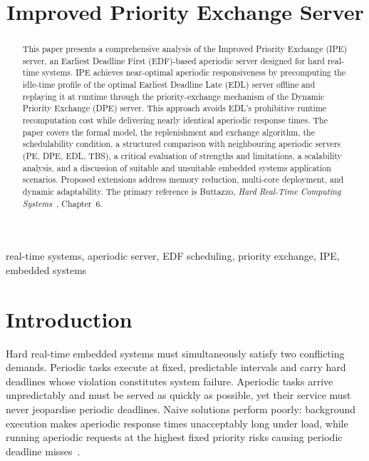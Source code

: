 \documentclass[conference]{IEEEtran}
\title{Improved Priority Exchange Server}
\author{%
  \IEEEauthorblockN{Sumon Boiddo}
  \IEEEauthorblockA{%
    BEng Electronic Engineering, Group~B, Team~6\\
    Hochschule Hamm-Lippstadt (HSHL), Lippstadt, Germany\\
    Matriculation Number:~2220054\\
    sumon.boiddo@stud.hshl.de}
}
\begin{document}
\maketitle

\begin{abstract}
This paper presents a comprehensive analysis of the Improved
Priority Exchange (IPE) server, an Earliest Deadline First
(EDF)-based aperiodic server designed for hard real-time systems.
IPE achieves near-optimal aperiodic responsiveness by
precomputing the idle-time profile of the optimal Earliest
Deadline Late (EDL) server offline and replaying it at runtime
through the priority-exchange mechanism of the Dynamic Priority
Exchange (DPE) server. This approach avoids EDL's prohibitive
runtime recomputation cost while delivering nearly identical
aperiodic response times. The paper covers the formal model,
the replenishment and exchange algorithm, the schedulability
condition, a structured comparison with neighbouring aperiodic
servers (PE, DPE, EDL, TBS), a critical evaluation of
strengths and limitations, a scalability analysis, and a
discussion of suitable and unsuitable embedded systems
application scenarios. Proposed extensions address memory
reduction, multi-core deployment, and dynamic adaptability.
The primary reference is Buttazzo, \emph{Hard Real-Time
Computing Systems}~\cite{buttazzo2011}, Chapter~6.
\end{abstract}

\begin{IEEEkeywords}
real-time systems, aperiodic server, EDF scheduling,
priority exchange, IPE, embedded systems
\end{IEEEkeywords}

\section{Introduction}

Hard real-time embedded systems must simultaneously satisfy two
conflicting demands. Periodic tasks execute at fixed, predictable
intervals and carry hard deadlines whose violation constitutes
system failure. Aperiodic tasks arrive unpredictably and must
be served as quickly as possible, yet their service must never
jeopardise periodic deadlines. Naive solutions perform poorly:
background execution makes aperiodic response times
unacceptably long under load, while running aperiodic requests
at the highest fixed priority risks causing periodic deadline
misses~\cite{buttazzo2011}.
\end{document}
